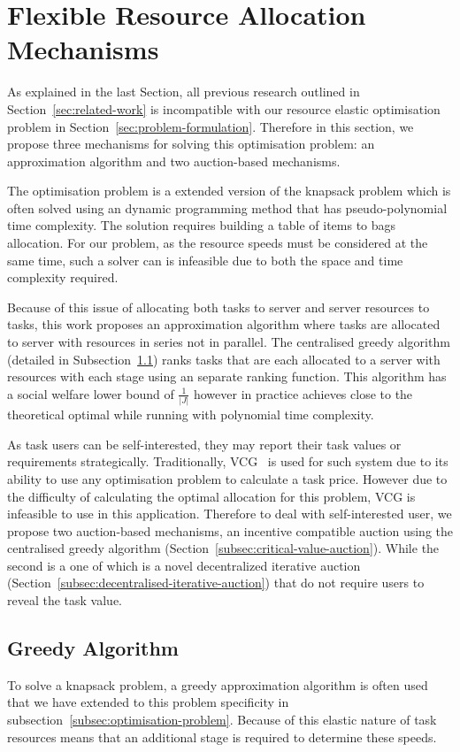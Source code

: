 \section{Flexible Resource Allocation Mechanisms}
\label{sec:flexible-resource-allocation-mechanisms}
As explained in the last Section, all previous research outlined in Section~\ref{sec:related-work} is incompatible
with our resource elastic optimisation problem in Section~\ref{sec:problem-formulation}. Therefore in this
section, we propose three mechanisms for solving this optimisation problem: an approximation algorithm and two
auction-based mechanisms.

The optimisation problem is a extended version of the knapsack problem which is often solved using an dynamic
programming method that has pseudo-polynomial time complexity. The solution requires building a table of items to bags
allocation. For our problem, as the resource speeds must be considered at the same time, such a solver can is
infeasible due to both the space and time complexity required.

Because of this issue of allocating both tasks to server and server resources to tasks, this work proposes an
approximation algorithm where tasks are allocated to server with resources in series not in parallel. The centralised
greedy algorithm (detailed in Subsection~\ref{subsec:greedy-algorithm}) ranks tasks that are each allocated to a server
with resources with each stage using an separate ranking function. This algorithm has a social welfare lower bound
of $\frac{1}{\left|J\right|}$ however in practice achieves close to the theoretical optimal while running with
polynomial time complexity.

As task users can be self-interested, they may report their task values or requirements strategically. Traditionally,
VCG~\citep{vickrey,Clarke,groves} is used for such system due to its ability to use any optimisation problem to
calculate a task price. However due to the difficulty of calculating the optimal allocation for this problem, VCG is
infeasible to use in this application. Therefore to deal with self-interested user, we propose two auction-based
mechanisms, an incentive compatible auction using the centralised greedy algorithm
(Section~\ref{subsec:critical-value-auction}). While the second is a one of which is a novel decentralized iterative
auction (Section~\ref{subsec:decentralised-iterative-auction}) that do not require users to reveal the task value.

\subsection{Greedy Algorithm}
\label{subsec:greedy-algorithm}
To solve a knapsack problem, a greedy approximation algorithm is often used that we have extended to this problem
specificity in subsection~\ref{subsec:optimisation-problem}. Because of this elastic nature of task resources means
that an additional stage is required to determine these speeds.

